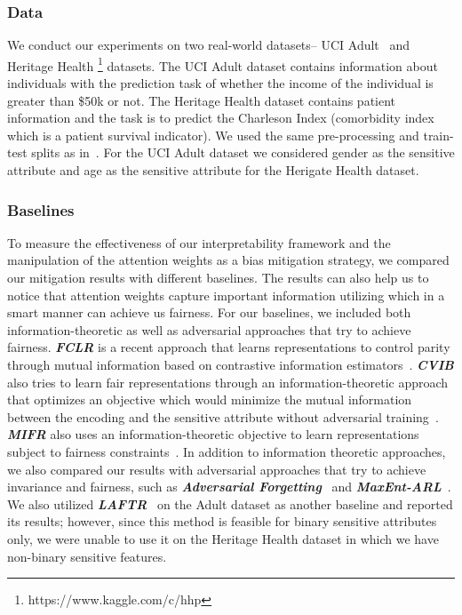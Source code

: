 \subsubsection{Data}
We conduct our experiments on two real-world datasets-- UCI Adult~\cite{Dua:2019} and Heritage Health \footnote{https://www.kaggle.com/c/hhp} datasets. The UCI Adult dataset contains information about individuals with the prediction task of whether the income of the individual is greater than \$50k or not. The Heritage Health dataset contains patient information and the task is to predict the Charleson Index (comorbidity index which is a patient survival indicator). We used the same pre-processing and train-test splits as in~\cite{gupta2021controllable}. For the UCI Adult dataset we considered gender as the sensitive attribute and age as the sensitive attribute for the Herigate Health dataset.
\subsubsection{Baselines}
To measure the effectiveness of our interpretability framework and the manipulation of the attention weights as a bias mitigation strategy, we compared our mitigation results with different baselines. The results can also help us to notice that attention weights capture important information utilizing which in a smart manner can achieve us fairness. For our baselines, we included both information-theoretic as well as adversarial approaches that try to achieve  fairness. \textit{\textbf{FCLR}} is a recent approach that learns representations to control parity through mutual information based on contrastive information estimators~\cite{gupta2021controllable}. \textit{\textbf{CVIB}} also tries to learn fair representations through an information-theoretic approach that optimizes an objective which would minimize the mutual information between the encoding and the sensitive attribute without adversarial training~\cite{NEURIPS2018_415185ea}. \textit{\textbf{MIFR}} also uses an information-theoretic objective to learn representations subject to fairness constraints~\cite{pmlr-v89-song19a}. In addition to information theoretic approaches, we also compared our results with adversarial approaches that try to achieve invariance and fairness, such as \textit{\textbf{Adversarial Forgetting}}~\cite{advforg} and \textit{\textbf{MaxEnt-ARL}}~\cite{roy2019mitigating}. We also utilized \textit{\textbf{LAFTR}}~\cite{pmlr-v80-madras18a} on the Adult dataset as another baseline and reported its results; however, since this method is feasible for binary sensitive attributes only, we were unable to use it on the Heritage Health dataset in which we have non-binary sensitive features.

